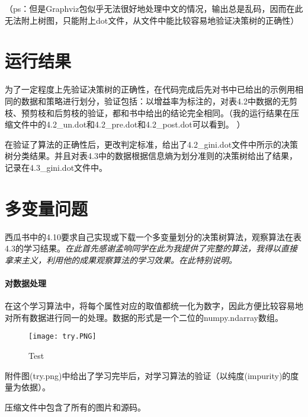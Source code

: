\documentclass[UTF8]{ctexart}
\begin{document}
（ps：但是Graphviz包似乎无法很好地处理中文的情况，输出总是乱码，因而在此无法附上树图，只能附上dot文件，从文件中能比较容易地验证决策树的正确性）

\section{运行结果}
为了一定程度上先验证决策树的正确性，在代码完成后先对书中已给出的示例用相同的数据和策略进行划分，验证包括：以增益率为标注的，对表4.2中数据的无剪枝、预剪枝和后剪枝的验证，都和书中给出的结论完全相同。（我的运行结果在压缩文件中的4.2\_un.dot和4.2\_pre.dot和4.2\_post.dot可以看到。
）

在验证了算法的正确性后，更改判定标准，给出了4.2\_gini.dot文件中所示的决策树分类结果。并且对表4.3中的数据根据信息熵为划分准则的决策树给出了结果，记录在4.3\_gini.dot文件中。
\section{多变量问题}
西瓜书中的4.10要求自己实现或下载一个多变量划分的决策树算法，观察算法在表4.3的学习结果。\emph{在此首先感谢孟响同学在此为我提供了完整的算法，我得以直接拿来主义，利用他的成果观察算法的学习效果。在此特别说明。}

\paragraph{对数据处理}在这个学习算法中，将每个属性对应的取值都统一化为数字，因此方便比较容易地对所有数据进行同一的处理。数据的形式是一个二位的numpy.ndarray数组。
\begin{figure}[htbp]
	\centering
	\texttt{[image: try.PNG]}
	\caption{Test}
\end{figure}
附件图(try.png)中给出了学习完毕后，对学习算法的验证（以纯度(impurity)的度量为依据）。

压缩文件中包含了所有的图片和源码。
\end{document}
